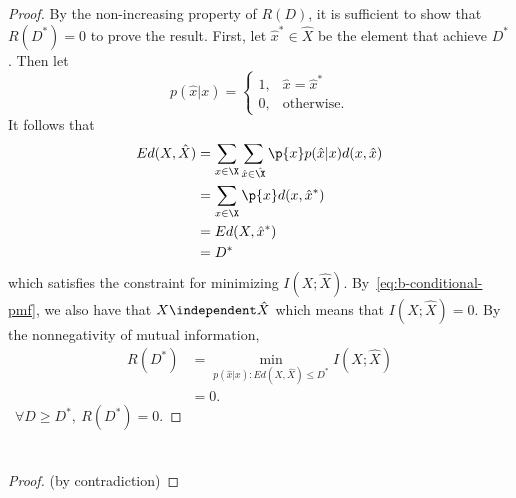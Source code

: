 \documentclass[
  coursecode={MTHE 477},
  assignmentname={Homework \homeworknumber},
  studentnumber=20053722,
  name={Bryan Hoang},
  draft,
]{
  ltxanswer%
}
\begin{document}
\begin{questions}
\begin{parts}
      \part{}
      \begin{solution}
        \begin{proof}
          By the non-increasing property of \(R(D)\), it is sufficient to show that \(R(D^{*}) = 0\) to prove the result. First, let \(\hat{x}^{*}\in\hat{X}\) be the element that achieve \(D^{*}\). Then let
          \begin{equation}\label{eq:b-conditional-pmf}
            p(\hat{x}|x) = \begin{cases}
              1, &\hat{x} = \hat{x}^{*} \\
              0, &\text{otherwise.}
            \end{cases}
          \end{equation}
          It follows that
          \begin{align*}
            Ed(X,\hat{X}) &= \sum_{x\in\X}\sum_{\hat{x}\in\hat{\X}} \p{x} p(\hat{x}|x) d(x,\hat{x}) \\
                          &= \sum_{x\in\X} \p{x} d(x,\hat{x}^{*})                                   \\
                          &= Ed(X,\hat{x}^{*})                                                      \\
                          &= D^{*}
          \end{align*}
          which satisfies the constraint for minimizing \(I(X;\hat{X})\). By~\eqref{eq:b-conditional-pmf}, we also have that \(X\independent\hat{X}\) which means that \(I(X;\hat{X}) = 0\). By the nonnegativity of mutual information,
          \begin{align*}
            R(D^{*}) &= \min_{p(\hat{x}|x) : Ed(X,\hat{X}) \le D^{*}} I(X;\hat{X}) \\
                     &= 0.
          \end{align*}
          \therefore\ \(\forall D \ge D^{*},\ R(D^{*}) = 0\).
        \end{proof}
      \end{solution}

      \part{}
      \begin{solution}
        \begin{proof}
          (by contradiction)


\end{proof}
\end{solution}
\end{parts}
\end{questions}
\end{document}
